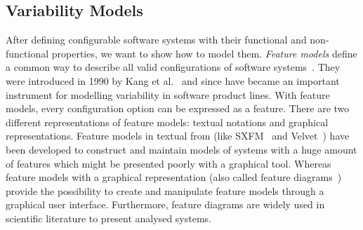 \subsection{Variability Models}
\label{background_variab_models}

After defining configurable software systems with their functional and non-functional properties, we want to show how to model them. 
\textit{Feature models} define a common way to describe all valid configurations of software systems~\cite{siegmund2015performance,sarkar2015cost,guo2013variability}. 
They were introduced in 1990 by Kang et al.~\cite{kang1990feature} and since have became an important instrument for modelling variability in software product lines. 
With feature models, every configuration option can be expressed as a feature. 
There are two different representations of feature models: textual notations and graphical representations. 
Feature models in textual from (like SXFM~\cite{Mendonca2009SSP} and Velvet~\cite{rosenmuller2011multi}) have been developed to construct and maintain models of systems with a huge amount of features which might be presented poorly with a graphical tool. 
Whereas feature models with a graphical representation (also called feature diagrams~\cite{kang1990feature}) provide the possibility to create and manipulate feature models through a graphical user interface. 
Furthermore, feature diagrams are widely used in scientific literature to present analysed systems. 


